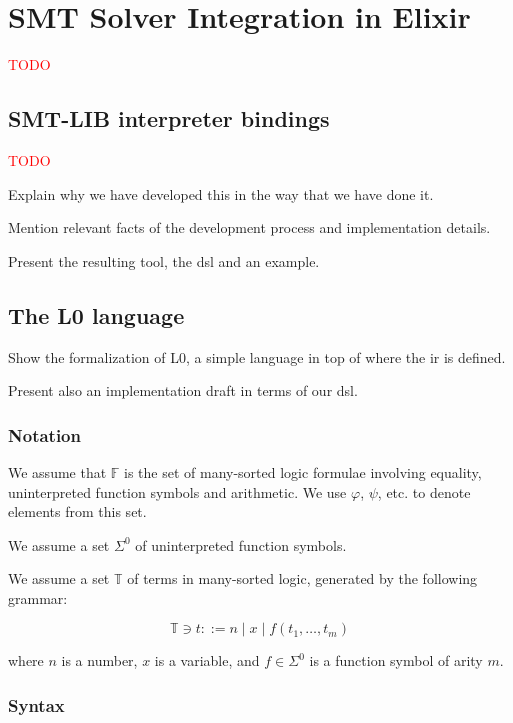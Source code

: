 \chapter{SMT Solver Integration in Elixir}
\label{cap:smtSolverIntegration}

\textcolor{red}{TODO}

\section{SMT-LIB interpreter bindings}

\textcolor{red}{TODO}

Explain why we have developed this in the way that we have done it.

Mention relevant facts of the development process and implementation details.

Present the resulting tool, the \gls{dsl} and an example.

\section{The L0 language}

Show the formalization of L0, a simple language in top of where 
the \gls{ir} is defined.

Present also an implementation draft in terms of our \gls{dsl}.

\subsection{Notation}

We assume that $\mathbb{F}$ is the set of many-sorted logic formulae involving
equality, uninterpreted function symbols and arithmetic. We use $\varphi$, 
$\psi$, etc. to denote elements from this set.

We assume a set $\Sigma^{0}$ of uninterpreted function symbols.

We assume a set $\mathbb{T}$ of terms in many-sorted logic, generated by the 
following grammar:

\[
\mathbb{T} \ni t ::= n \mid x \mid f(t_1, \ldots, t_m)
\]

where $n$ is a number, $x$ is a variable, and $f \in \Sigma^0$ is a function 
symbol of arity $m$.

\subsection{Syntax}

